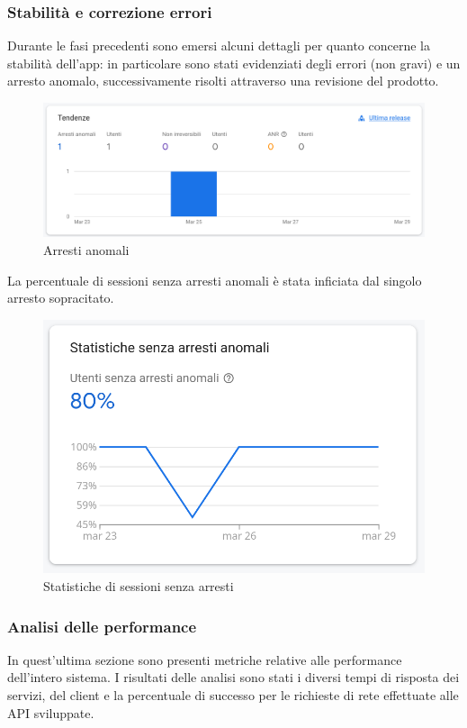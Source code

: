 \documentclass{natourDoc}
\begin{document}
\subsubsection{Stabilità e correzione errori}
Durante le fasi precedenti sono emersi alcuni dettagli per quanto concerne la stabilità dell'app:
in particolare sono stati evidenziati degli errori (non gravi) e un arresto anomalo, successivamente risolti
attraverso una revisione del prodotto.
\begin{figure}[!htbp]
	\centering
	\includegraphics[width=\textwidth]{./analytics/arresti-anomali.png}
	\caption{Arresti anomali}
\end{figure}
\FloatBarrier

La percentuale di sessioni senza arresti anomali è stata inficiata dal singolo arresto sopracitato.
\begin{figure}[!htbp]	
	\centering
	\includegraphics[width=\textwidth]{./analytics/senza-arresti.png}
	\caption{Statistiche di sessioni senza arresti}
\end{figure}
\FloatBarrier

\newpage

\subsubsection{Analisi delle performance}
In quest'ultima sezione sono presenti metriche relative alle performance dell'intero sistema.
I risultati delle analisi sono stati i diversi tempi di risposta dei servizi, del client e la percentuale di successo per le richieste di rete
effettuate alle API sviluppate.
\end{document}
